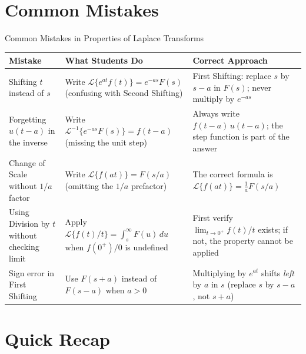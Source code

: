 \documentclass[12pt,a4paper]{article}
\begin{document}
\section{Common Mistakes}

\begin{mistakebox}{Common Mistakes in Properties of Laplace Transforms}
\begin{tabular}{@{}p{4cm}p{4.5cm}p{5cm}@{}}
\toprule
\textbf{Mistake} & \textbf{What Students Do} & \textbf{Correct Approach} \\
\midrule
Shifting $t$ instead of $s$ &
  Write $\mathcal{L}\{e^{at}f(t)\} = e^{-as}F(s)$ (confusing with Second Shifting) &
  First Shifting: replace $s$ by $s-a$ in $F(s)$; never multiply by $e^{-as}$ \\
\midrule
Forgetting $u(t-a)$ in the inverse &
  Write $\mathcal{L}^{-1}\{e^{-as}F(s)\} = f(t-a)$ (missing the unit step) &
  Always write $f(t-a)\,u(t-a)$; the step function is part of the answer \\
\midrule
Change of Scale without $1/a$ factor &
  Write $\mathcal{L}\{f(at)\} = F(s/a)$ (omitting the $1/a$ prefactor) &
  The correct formula is $\mathcal{L}\{f(at)\} = \tfrac{1}{a}F(s/a)$ \\
\midrule
Using Division by $t$ without checking limit &
  Apply $\mathcal{L}\{f(t)/t\} = \int_s^\infty F(u)\,du$ when $f(0^+)/0$ is undefined &
  First verify $\lim_{t\to 0^+} f(t)/t$ exists; if not, the property cannot be applied \\
\midrule
Sign error in First Shifting &
  Use $F(s+a)$ instead of $F(s-a)$ when $a > 0$ &
  Multiplying by $e^{at}$ shifts \emph{left} by $a$ in $s$ (replace $s$ by $s-a$, not $s+a$) \\
\bottomrule
\end{tabular}
\end{mistakebox}

\section{Quick Recap}
\end{document}
